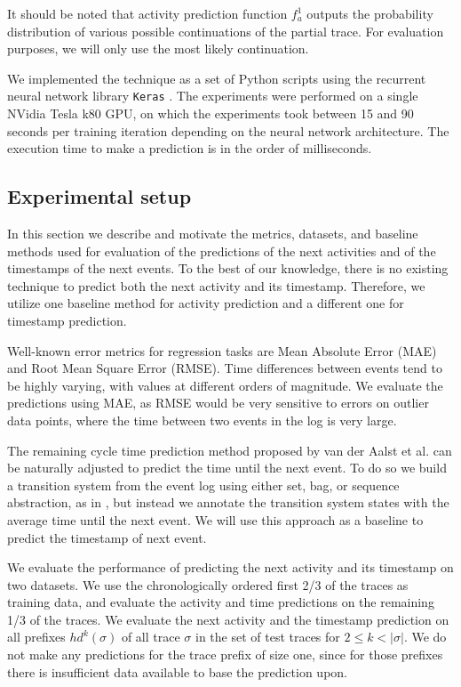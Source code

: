 \documentclass[runningheads,a4paper]{llncs}
\begin{document}
It should be noted that activity prediction function $f_a^1$ outputs the probability distribution of various possible continuations of the partial trace. For evaluation purposes, we will only use the most likely continuation.

We implemented the technique as a set of Python scripts using the recurrent neural network library \texttt{Keras} \cite{Chollet2015}. The experiments were performed on a single NVidia Tesla k80 GPU, on which the experiments took between 15 and 90 seconds per training iteration depending on the neural network architecture. The execution time to make a prediction is in the order of milliseconds. 

\subsection{Experimental setup}
In this section we describe and motivate the metrics, datasets, and baseline methods used for evaluation of the predictions of the next activities and of the timestamps of the next events. To the best of our knowledge, there is no existing technique to predict both the next activity and its timestamp. Therefore, we utilize one baseline method for activity prediction and a different one for timestamp prediction.

Well-known error metrics for regression tasks are Mean Absolute Error (MAE) and Root Mean Square Error (RMSE). Time differences between events tend to be highly varying, with values at different orders of magnitude. We evaluate the predictions using MAE, as RMSE would be very sensitive to errors on outlier data points, where the time between two events in the log is very large. 

The remaining cycle time prediction method proposed by van der Aalst et al. \cite{Aalst2011} can be naturally adjusted to predict the time until the next event. To do so we build a transition system from the event log using either set, bag, or sequence abstraction, as in \cite{Aalst2011}, but instead we annotate the transition system states with the average time until the next event. We will use this approach as a baseline to predict the timestamp of next event.

We evaluate the performance of predicting the next activity and its timestamp on two datasets. We use the chronologically ordered first 2/3 of the traces as training data, and evaluate the activity and time predictions on the remaining 1/3 of the traces. We evaluate the next activity and the timestamp prediction on all prefixes $\mathit{hd}^k(\sigma)$ of all trace $\sigma$ in the set of test traces for $2\le k<|\sigma|$. We do not make any predictions for the trace prefix of size one, since for those prefixes there is insufficient data available to base the prediction upon.
\end{document}
